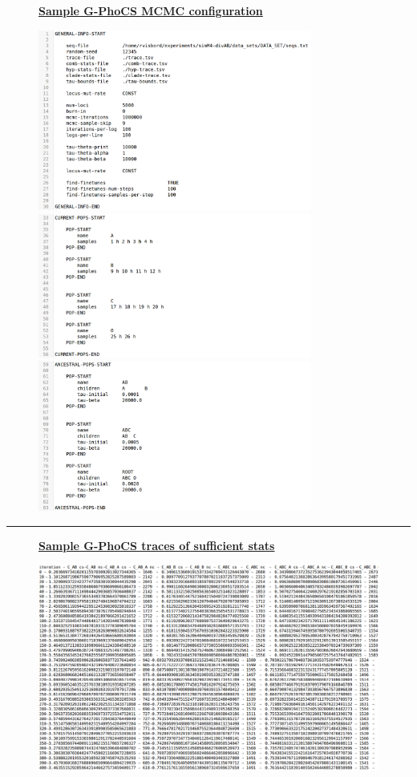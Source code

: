 \documentclass[11pt]{article}
\newcommand{\1}{\mathbbm{1}}
\newcommand{\gp}{G-PhoCS }
\newcommand{\figuretitle}[1]{
	\centering
	\underline{\textbf{#1}}
	\par
	\medskip
}
\begin{document}
\begin{figure}[H]
\figuretitle{Sample \gp MCMC configuration}
\includegraphics[width=0.8\textwidth]{appendix/general_info}
\includegraphics[width=0.8\textwidth]{appendix/current_pops}
\includegraphics[width=0.8\textwidth]{appendix/ancestral_pops}
\label{fig:sample_McRef_output}
\end{figure}

\noindent\rule{16cm}{0.4pt}

\begin{figure}[H]
\figuretitle{Sample \gp traces of sufficient stats}
\includegraphics[width=1.0\textwidth]{appendix/sample_gphocs_sufficient_stats_trace}
\label{fig:sample_McRef_output}
\end{figure}
\end{document}
